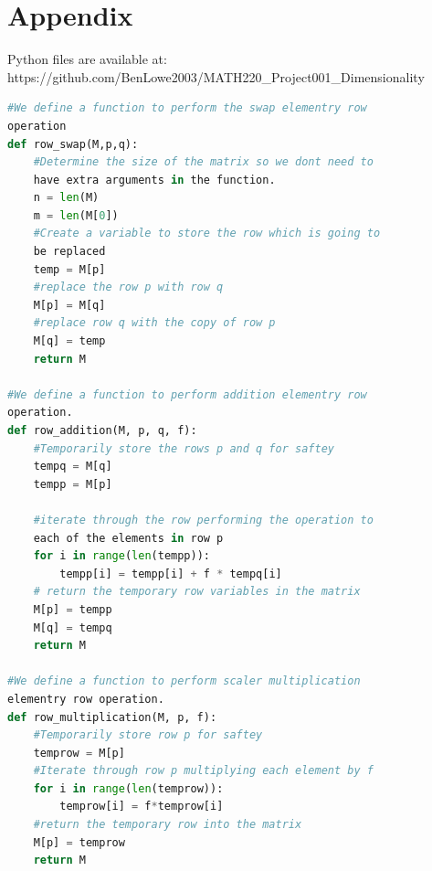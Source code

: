 \documentclass{article}
\begin{document}
\break

\section{Appendix}

Python files are available at: https://github.com/BenLowe2003/MATH220\_Project001\_Dimensionality

\begin{lstlisting}[language=Python, caption=Functions In Linear Algebra, label=fuctions]
#We define a function to perform the swap elementry row 
operation
def row_swap(M,p,q):
    #Determine the size of the matrix so we dont need to 
    have extra arguments in the function.
    n = len(M)
    m = len(M[0])
    #Create a variable to store the row which is going to 
    be replaced
    temp = M[p]
    #replace the row p with row q
    M[p] = M[q]
    #replace row q with the copy of row p
    M[q] = temp
    return M

#We define a function to perform addition elementry row 
operation.
def row_addition(M, p, q, f):
    #Temporarily store the rows p and q for saftey
    tempq = M[q]
    tempp = M[p]
    
    #iterate through the row performing the operation to 
    each of the elements in row p
    for i in range(len(tempp)):
        tempp[i] = tempp[i] + f * tempq[i]
    # return the temporary row variables in the matrix
    M[p] = tempp
    M[q] = tempq
    return M

#We define a function to perform scaler multiplication 
elementry row operation.
def row_multiplication(M, p, f):
    #Temporarily store row p for saftey
    temprow = M[p]
    #Iterate through row p multiplying each element by f
    for i in range(len(temprow)):
        temprow[i] = f*temprow[i]
    #return the temporary row into the matrix
    M[p] = temprow
    return M


\end{lstlisting}
\end{document}
